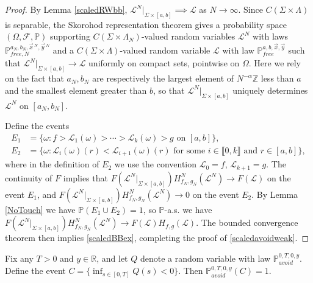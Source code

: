 \begin{proof}
	By Lemma \ref{scaledRWbb}, $\mathcal{L}^N|_{\Sigma\times[a,b]} \implies \mathcal{L}$ as $N\to\infty$. Since $C(\Sigma\times\Lambda)$ is separable, the Skorohod representation theorem \cite[Theorem 6.7]{Billing} gives a probability space $(\Omega,\mathcal{F},\mathbb{P})$ supporting $C(\Sigma\times\Lambda_N)$-valued random variables $\mathcal{L}^N$ with laws $\mathbb{P}^{a_N,b_N,\vec{x}\,^N,\vec{y}\,^N}_{free,N}$ and a $C(\Sigma\times\Lambda)$-valued random variable $\mathcal{L}$ with law $\mathbb{P}^{a,b,\vec{x},\vec{y}}_{free}$ such that $\mathcal{L}^N|_{\Sigma\times[a,b]}\to\mathcal{L}$ uniformly on compact sets, pointwise on $\Omega$. Here we rely on the fact that $a_N,b_N$ are respectively the largest element of $N^{-\alpha}\mathbb{Z}$ less than $a$ and the smallest element greater than $b$, so that $\mathcal{L}^N|_{\Sigma\times[a,b]}$ uniquely determines $\mathcal{L}^N$ on $[a_N,b_N]$.
	
	Define the events
	\begin{align*}
	E_1 &= \{\omega : f > \mathcal{L}_1(\omega) > \cdots > \mathcal{L}_k(\omega) > g \mbox{ on } [a,b]\},\\
	E_2 &= \{\omega : \mathcal{L}_i(\omega)(r) < \mathcal{L}_{i+1}(\omega)(r) \mbox{ for some } i\in\llbracket 0,k\rrbracket \mbox{ and } r\in[a,b]\},
	\end{align*}
	where in the definition of $E_2$ we use the convention $\mathcal{L}_0 = f$, $\mathcal{L}_{k+1} = g$. The continuity of $F$ implies that $F(\mathcal{L}^N|_{\Sigma\times[a,b]})H^N_{f_N,g_N}(\mathcal{L}^N) \to F(\mathcal{L})$ on the event $E_1$, and $F(\mathcal{L}^N|_{\Sigma\times[a,b]})H^N_{f_N,g_N}(\mathcal{L}^N)\to 0$ on the event $E_2$. By Lemma \ref{NoTouch} we have $\mathbb{P}(E_1 \cup E_2) = 1$, so $\mathbb{P}$-a.s. we have $F(\mathcal{L}^N|_{\Sigma\times[a,b]})H^N_{f_N,g_N}(\mathcal{L}^N) \to F(\mathcal{L})H_{f,g}(\mathcal{L})$. The bounded convergence theorem then implies \eqref{scaledBBex}, completing the proof of \eqref{scaledavoidweak}.
\end{proof}

\begin{lemma}\label{BBcross0}
	Fix any $T>0$ and $y\in\mathbb{R}$, and let $Q$ denote a random variable with law $\mathbb{P}^{0,T,0,y}_{avoid}$. Define the event $C = \{\inf_{s\in[0,T]} Q(s) < 0\}$. Then $\mathbb{P}^{0,T,0,y}_{avoid}(C) = 1$.
\end{lemma}

